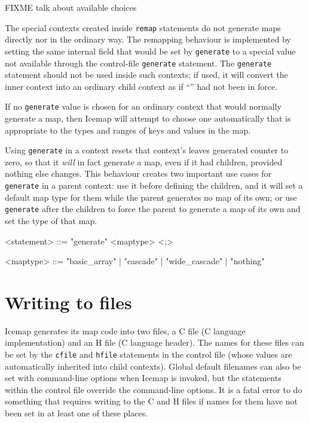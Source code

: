 \documentclass{mitsuba}
\begin{document}
FIXME talk about available choices

The special contexts created inside \texttt{remap} statements do
not generate maps directly nor in the ordinary way.  The remapping behaviour
is implemented by setting the same internal field that would be set by
\texttt{generate} to a special value not available through the control-file
\texttt{generate} statement.  The \texttt{generate} statement should not be
used inside such contexts; if used, it will convert the inner context into
an ordinary child context as if ``'' had not been in force.

If no \texttt{generate} value is chosen for an ordinary context that would
normally generate a map, then Icemap will attempt to choose one
automatically that is appropriate to the types and ranges of keys and values
in the map.

Using \texttt{generate} in a context resets that context's leaves generated
counter to zero, so that it \emph{will} in fact generate a map, even if it
had children, provided nothing else changes.  This behaviour creates two
important use cases for \texttt{generate} in a parent context:  use it
before defining the children, and it will set a default map type for them
while the parent generates no map of its own; or use \texttt{generate} after
the children to force the parent to generate a map of its own and set the
type of that map.

\begin{grammar}
<statement> ::= "generate" <maptype> <;>

<maptype> ::= "basic_array" | "cascade" | "wide_cascade" | "nothing"
\end{grammar}

\section{Writing to files}

Icemap generates its map code into two files, a C file (C language
implementation) and an H file (C language header).  The names for these
files can be set by the \texttt{cfile} and \texttt{hfile} statements in the
control file (whose values are automatically inherited into child contexts). 
Global default filenames can also be set with command-line options when
Icemap is invoked, but the statements within the control file override the
command-line options.  It is a fatal error to do something that requires
writing to the C and H files if names for them have not been set in at least
one of these places.
\end{document}
